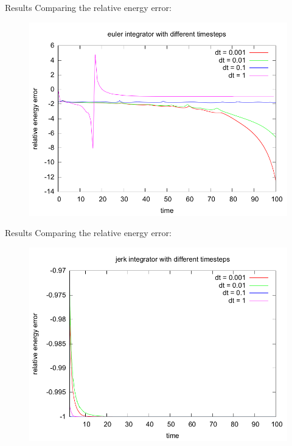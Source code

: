 \documentclass{beamer}
\begin{document}
\begin{frame}{Results}
  Comparing the relative energy error:
  \begin{figure}
   \includegraphics[width=0.6\paperwidth]{../results/euler_different_timesteps.png}
\end{figure}
\end{frame}

\begin{frame}{Results}
  Comparing the relative energy error:
  \begin{figure}
   \includegraphics[width=0.6\paperwidth]{../results/jerk_different_timesteps_truncated.png}
\end{figure}
\end{frame}
\end{document}
